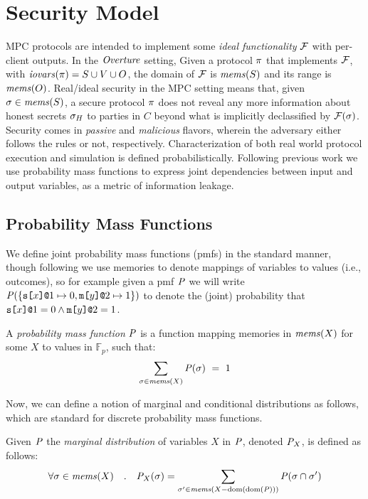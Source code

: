 \section{Security Model}
\label{section-pmf}
\label{section-model}

MPC protocols are intended to implement some \emph{ideal
functionality} $\mathcal{F}$ with per-client outputs. In the $\mathit{Overture}$
setting, Given a protocol $\pi$ that implements $\mathcal{F}$, with
$\mathit{iovars}(\pi) = S \cup V \cup O$, the domain of $\mathcal{F}$ is $\mathit{mems}(S)$
and its range is $\mathit{mems}(O)$.  Real/ideal security in the MPC
setting means that, given $\sigma \in \mathit{mems}(S)$, a secure protocol
$\pi$ does not reveal any more information about honest secrets
$\sigma_H$ to parties in $C$ beyond what is implicitly declassified by
$\mathcal{F}(\sigma)$. Security comes in \emph{passive} and
\emph{malicious} flavors, wherein the adversary either follows the
rules or not, respectively. Characterization of both real world
protocol execution and simulation is defined
probabilistically. Following previous work
\cite{barthe2019probabilistic} we use probability mass functions to
express joint dependencies between input and output variables, as a
metric of information leakage.

\subsection{Probability Mass Functions} 

We define joint probability mass functions (pmfs) in the standard
manner, though following \cite{barthe2019probabilistic} we use
memories to denote mappings of variables to values (i.e., outcomes),
so for example given a pmf $\mathit{P}$ we will write $\mathit{P}(\{ \texttt{s[}x\texttt{]}\texttt{@}1
\mapsto 0, \texttt{m[}y\texttt{]}\texttt{@}2 \mapsto 1 \})$ to denote the (joint) probability that
$\texttt{s[}x\texttt{]}\texttt{@}1 = 0 \wedge \texttt{m[}y\texttt{]}\texttt{@}2 = 1$.
\begin{definition}
  A \emph{probability mass function} $\mathit{P}$ is a function
  mapping memories in $\mathit{mems}(X)$ for some $X$ to values in $\mathbb{F}_p$, such that:
  $$
  \sum_{\sigma \in \mathit{mems}(X)} \mathit{P}(\sigma) \  = \ 1
  $$
\end{definition}
Now, we can define a notion of marginal and conditional
distributions as follows, which are standard for discrete
probability mass functions. 
\begin{definition}
  Given $\mathit{P}$ the \emph{marginal distribution} of variables $X$
  in $\mathit{P}$, denoted ${\mathit{P}}_{X}$, is defined as follows:
  $$
  \forall \sigma \in \mathit{mems}(X) \quad . \quad {\mathit{P}}_{X}(\sigma) =
  \sum_{\sigma' \in \mathit{mems}(X-\mathrm{dom}(\mathrm{dom}(\mathit{P})))} \mathit{P}(\sigma \cap \sigma')
  $$
\end{definition}

